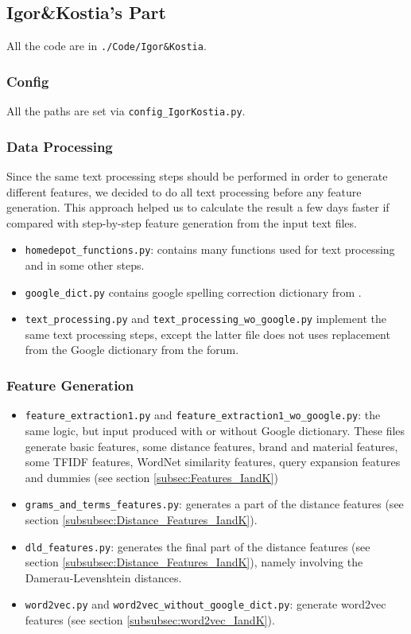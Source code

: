 \documentclass[12pt]{article}
\begin{document}
{{\subsection{Igor\&Kostia's Part}
\label{subsec:code_IandK}
All the code are in \texttt{./Code/Igor\&Kostia}.
\subsubsection{Config}
All the paths  are set via \texttt{config\_IgorKostia.py}.


\subsubsection{Data Processing}
Since the same text processing steps should be performed in order to generate different features, we decided to do all text processing before any feature generation. This approach helped us to calculate the result a few days faster if compared with step-by-step feature generation from the input text files.
\begin{itemize}
\item \texttt{homedepot\_functions.py}: contains many functions used for text processing and in some other steps.
\item  \texttt{google\_dict.py}  contains google spelling correction dictionary from \cite{Google_dict}.
\item \texttt{text\_processing.py} and  \texttt{text\_processing\_wo\_google.py} implement the same text processing steps, except the latter file does not uses replacement from the Google dictionary from the forum.
\end{itemize}
\subsubsection{Feature Generation}
\begin{itemize}
\item \texttt{feature\_extraction1.py} and \texttt{feature\_extraction1\_wo\_google.py}: the same logic, but input produced with or without Google dictionary. These files generate basic features, some distance features, brand and material features, some TFIDF features, WordNet similarity features, query expansion features and dummies (see section \ref{subsec:Features_IandK})
\item \texttt{grams\_and\_terms\_features.py}: generates a part of the distance features (see section \ref{subsubsec:Distance_Features_IandK}).
\item \texttt{dld\_features.py}: generates the final part of the distance features  (see section \ref{subsubsec:Distance_Features_IandK}), namely involving the Damerau-Levenshtein distances.
\item \texttt{word2vec.py} and \texttt{word2vec\_without\_google\_dict.py}: generate word2vec features  (see section \ref{subsubsec:word2vec_IandK}).
\end{itemize}

}}
\end{document}
